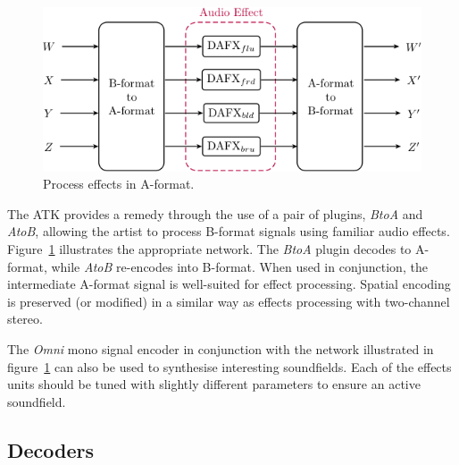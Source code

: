 \documentclass{article}
\begin{document}
\begin{figure}[h]
\captionsetup{aboveskip=-6pt}
\centering
\includegraphics[width=1.0\columnwidth]{figures/DAFXNetwork.png}
\setlength{\abovecaptionskip}{0pt plus 3pt minus 2pt} %
\caption{Process effects in A-format.\label{fig:aToB}}
\end{figure}

The ATK provides a remedy through the use of a pair of plugins, \emph{BtoA} and \emph{AtoB}, allowing the artist to process B-format signals using familiar audio effects. Figure~\ref{fig:aToB} illustrates the appropriate network. The \emph{BtoA} plugin decodes to A-format, while \emph{AtoB} re-encodes into B-format. When used in conjunction, the intermediate A-format signal is well-suited for effect processing. Spatial encoding is preserved (or modified) in a similar way as effects processing with two-channel stereo.

The \emph{Omni} mono signal encoder in conjunction with the network illustrated in figure~\ref{fig:aToB} can also be used to synth\-esise interesting soundfields. Each of the effects units should be tuned with slightly different parameters to ensure an active soundfield.





\subsection{Decoders}\label{sec:decoders}
\end{document}
